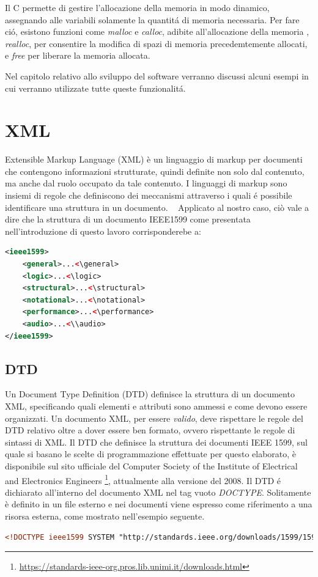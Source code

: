 \documentclass[12pt,italian]{report}
\begin{document}
Il C permette di gestire l'allocazione della memoria in modo dinamico, assegnando alle variabili solamente la quantitá di memoria necessaria. Per fare ci\'o, esistono funzioni come \textit{malloc} e \textit{calloc}, adibite all'allocazione della memoria , \textit{realloc}, per consentire la modifica di spazi di memoria precedemtemente allocati, e \textit{free} per liberare la memoria allocata.

Nel capitolo relativo allo sviluppo del software verranno discussi alcuni esempi in cui verranno utilizzate tutte queste funzionalit\'a.

\section{XML}
\label{sec:xml}

Extensible Markup Language (XML) \`e un linguaggio di markup per documenti che contengono informazioni strutturate, quindi definite non solo dal contenuto, ma anche dal ruolo occupato da tale contenuto.
I linguaggi di markup sono insiemi di regole che definiscono dei meccanismi attraverso i quali é possibile identificare una struttura in un documento. ~\cite{walsh1998xml}
Applicato al nostro caso, ci\`o vale a dire che la struttura di un documento IEEE1599 come presentata nell'introduzione di questo lavoro corrisponderebe a: 
\begin{lstlisting}[language=XML]
<ieee1599>
	<general>...<\general>
	<logic>...<\logic>
	<structural>...<\structural>
	<notational>...<\notational>
	<performance>...<\performance>
	<audio>...<\\audio>
</ieee1599>
\end{lstlisting}

\subsection{DTD}
\label{subsec:dtd}

Un Document Type Definition (DTD) definisce la struttura di un documento XML, specificando quali elementi e attributi sono ammessi e come devono essere organizzati. 
Un documento XML, per essere \textit{valido}, deve rispettare le regole del DTD relativo oltre a dover essere ben formato, ovvero rispettante le regole di sintassi di XML.
Il DTD che definisce la struttura dei documenti IEEE 1599, sul quale si basano le scelte di programmazione effettuate per questo elaborato, è disponibile sul sito ufficiale del Computer Society of the Institute of Electrical
and Electronics Engineers \footnote{\url{https://standards-ieee-org.pros.lib.unimi.it/downloads.html}}, attualmente alla versione del 2008.
Il DTD é dichiarato all'interno del documento XML nel tag vuoto \textit{DOCTYPE}. Solitamente \`e definito in un file esterno e nei documenti viene espresso come riferimento a una risorsa esterna, come mostrato nell'esempio seguente.
\begin{lstlisting}[language=XML]
<!DOCTYPE ieee1599 SYSTEM "http://standards.ieee.org/downloads/1599/1599-2008/ieee1599.dtd">
\end{lstlisting}
\end{document}
